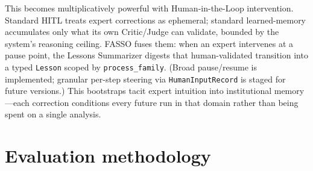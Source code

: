 \documentclass[11pt]{article}
\begin{document}
This becomes multiplicatively powerful with Human-in-the-Loop intervention. Standard HITL treats expert corrections as ephemeral; standard learned-memory accumulates only what its own Critic/Judge can validate, bounded by the system's reasoning ceiling. FASSO fuses them: when an expert intervenes at a pause point, the Lessons Summarizer digests that human-validated transition into a typed \texttt{Lesson} scoped by \texttt{process\_family}. (Broad pause/resume is implemented; granular per-step steering via \texttt{HumanInputRecord} is staged for future versions.) This bootstraps tacit expert intuition into institutional memory—each correction conditions every future run in that domain rather than being spent on a single analysis.

\section{Evaluation methodology}
\label{sec:evaluation}
\end{document}
